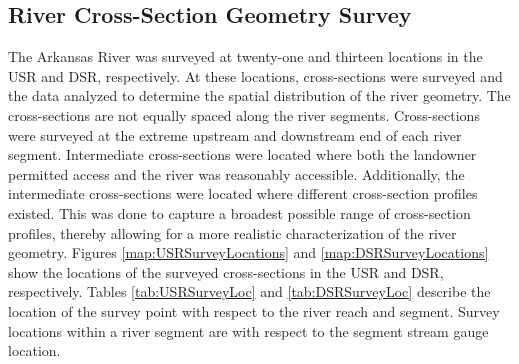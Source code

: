 \begin{linenumbers}
\section{River Cross-Section Geometry Survey}
\label{sec:River_Survey}
The Arkansas River was surveyed at twenty-one and thirteen locations in the USR and DSR, respectively.  At these locations, cross-sections were surveyed and the data analyzed to determine the spatial distribution of the river geometry.  The cross-sections are not equally spaced along the river segments.  Cross-sections were surveyed at the extreme upstream and downstream end of each river segment.  Intermediate cross-sections were located where both the landowner permitted access and the river was reasonably accessible.  Additionally, the intermediate cross-sections were located where different cross-section profiles existed.  This was done to capture a broadest possible range of cross-section profiles, thereby allowing for a more realistic characterization of the river geometry.  Figures \ref{map:USRSurveyLocations} and \ref{map:DSRSurveyLocations} show the locations of the surveyed cross-sections in the USR and DSR, respectively.  Tables \ref{tab:USRSurveyLoc} and \ref{tab:DSRSurveyLoc} describe the location of the survey point with respect to the river reach and segment.  Survey locations within a river segment are with respect to the segment stream gauge location.



\end{linenumbers}
